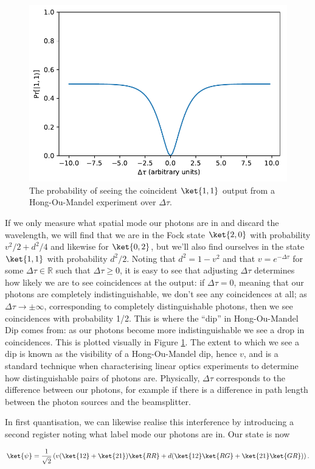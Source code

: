 \begin{figure}
\begin{center}
\includegraphics[width=0.5\linewidth]{preliminary_bs/hom_plot}
\end{center}
\caption{\label{fig:hom-plot}The probability of seeing the coincident $\ket{1,1}$ output from a Hong-Ou-Mandel experiment over $\Delta\tau$.}
\end{figure}

If we only measure what spatial mode our photons are in and discard the wavelength, we will find that we are in the Fock state $\ket{2,0}$ with probability $v^2/2 + d^2/4$ and likewise for $\ket{0,2}$, but we'll also find ourselves in the state $\ket{1,1}$ with probability $d^2/2$. Noting that $d^2 = 1-v^2$ and that $v=e^{-\Delta\tau}$ for some $\Delta\tau\in \mathbb{R}$ such that $\Delta\tau \geq 0$, it is easy to see that adjusting $\Delta\tau$ determines how likely we are to see coincidences at the output: if $\Delta\tau=0$, meaning that our photons are completely indistinguishable, we don't see any coincidences at all; as $\Delta\tau\rightarrow\pm\infty$, corresponding to completely distinguishable photons, then we see coincidences with probability 1/2. This is where the ``dip'' in Hong-Ou-Mandel Dip comes from: as our photons become more indistinguishable we see a drop in coincidences. This is plotted visually in Figure \ref{fig:hom-plot}. The extent to which we see a dip is known as the visibility of a Hong-Ou-Mandel dip, hence $v$, and is a standard technique when characterising linear optics experiments to determine how distinguishable pairs of photons are. Physically, $\Delta\tau$ corresponds to the difference between our photons, for example if there is a difference in path length between the photon sources and the beamsplitter.

In first quantisation, we can likewise realise this interference by introducing a second register noting what label mode our photons are in. Our state is now

\begin{equation}
\ket{\psi} = \frac{1}{\sqrt{2}}\left(v(\ket{12}+\ket{21})\ket{RR}+d(\ket{12}\ket{RG} + \ket{21}\ket{GR})\right).
\end{equation}

